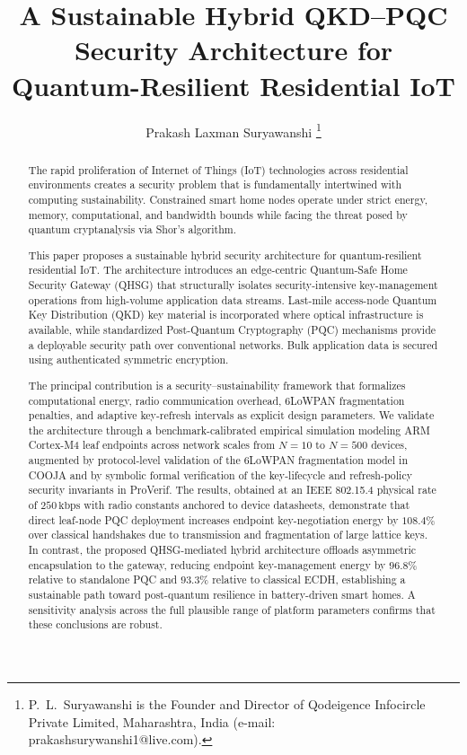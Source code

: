 \documentclass[journal]{IEEEtran}
\begin{document}
\title{A Sustainable Hybrid QKD--PQC Security Architecture for
Quantum-Resilient Residential IoT}

\author{Prakash Laxman Suryawanshi%
\thanks{P.~L.~Suryawanshi is the Founder and Director of Qodeigence Infocircle
Private Limited, Maharashtra, India (e-mail: prakashsurywanshi1@live.com).}}

\maketitle

\begin{abstract}
The rapid proliferation of Internet of Things (IoT) technologies across residential
environments creates a security problem that is fundamentally intertwined with computing
sustainability. Constrained smart home nodes operate under strict energy, memory,
computational, and bandwidth bounds while facing the threat posed by quantum
cryptanalysis via Shor's algorithm. 

This paper proposes a sustainable hybrid security architecture for quantum-resilient
residential IoT. The architecture introduces an edge-centric Quantum-Safe Home Security
Gateway (QHSG) that structurally isolates security-intensive key-management operations
from high-volume application data streams. Last-mile access-node Quantum Key Distribution
(QKD) key material is incorporated where optical infrastructure is available, while
standardized Post-Quantum Cryptography (PQC) mechanisms provide a deployable security
path over conventional networks. Bulk application data is secured using authenticated
symmetric encryption.

The principal contribution is a security--sustainability framework that formalizes
computational energy, radio communication overhead, 6LoWPAN fragmentation penalties,
and adaptive key-refresh intervals as explicit design parameters. We validate the
architecture through a benchmark-calibrated empirical simulation modeling ARM Cortex-M4
leaf endpoints across network scales from $N=10$ to $N=500$ devices, augmented by
protocol-level validation of the 6LoWPAN fragmentation model in COOJA and by
symbolic formal verification of the key-lifecycle and refresh-policy security
invariants in ProVerif. The results, obtained at an IEEE 802.15.4 physical rate of $250\,\text{kbps}$ with
radio constants anchored to device datasheets, demonstrate that direct leaf-node PQC
deployment increases endpoint key-negotiation energy by $108.4\%$ over classical handshakes
due to transmission and fragmentation of large lattice keys. In contrast, the proposed
QHSG-mediated hybrid architecture offloads asymmetric encapsulation to the gateway,
reducing endpoint key-management energy by $96.8\%$ relative to standalone PQC and
$93.3\%$ relative to classical ECDH, establishing a sustainable path toward post-quantum
resilience in battery-driven smart homes. A sensitivity analysis across the full
plausible range of platform parameters confirms that these conclusions are robust.
\end{abstract}
\end{document}

